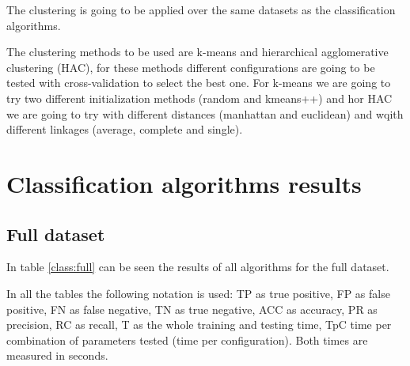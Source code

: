 \documentclass[a4paper,11pt]{article}
\begin{document}
The clustering is going to be applied over the same datasets as the classification algorithms.

The clustering methods to be used are k-means and hierarchical agglomerative clustering (HAC), for these methods different configurations are going to be tested with cross-validation to select the best one. For k-means we are going to try two different initialization methods (random and kmeans++) and hor HAC we are going to try with different distances (manhattan and euclidean) and wqith different linkages (average, complete and single).

\section{Classification algorithms results}

\subsection{Full dataset}

In table \ref{class:full} can be seen the results of all algorithms for the full dataset.

In all the tables the following notation is used: TP as true positive, FP as false positive, FN as false negative, TN as true negative, ACC as accuracy, PR as precision, RC as recall, T as the whole training and testing time, TpC time per combination of parameters tested (time per configuration). Both times are measured in seconds.
\end{document}
